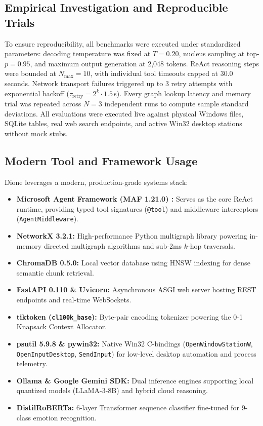 \documentclass[conference,a4paper]{IEEEtran}
\begin{document}
\subsection{Empirical Investigation and Reproducible Trials}
To ensure reproducibility, all benchmarks were executed under standardized parameters: decoding temperature was fixed at $T = 0.20$, nucleus sampling at top-$p = 0.95$, and maximum output generation at 2,048 tokens. ReAct reasoning steps were bounded at $N_{\text{max}} = 10$, with individual tool timeouts capped at 30.0 seconds. Network transport failures triggered up to 3 retry attempts with exponential backoff ($\tau_{\text{retry}} = 2^k \cdot 1.5$\,s). Every graph lookup latency and memory trial was repeated across $N = 3$ independent runs to compute sample standard deviations. All evaluations were executed live against physical Windows files, SQLite tables, real web search endpoints, and active Win32 desktop stations without mock stubs.

\subsection{Modern Tool and Framework Usage}
Dione leverages a modern, production-grade systems stack:
\begin{itemize}
    \item \textbf{Microsoft Agent Framework (MAF 1.21.0) \cite{microsoft2025agentframework}:} Serves as the core ReAct runtime, providing typed tool signatures (\texttt{@tool}) and middleware interceptors (\texttt{AgentMiddleware}).
    \item \textbf{NetworkX 3.2.1:} High-performance Python multigraph library powering in-memory directed multigraph algorithms and sub-2ms $k$-hop traversals.
    \item \textbf{ChromaDB 0.5.0:} Local vector database using HNSW indexing for dense semantic chunk retrieval.
    \item \textbf{FastAPI 0.110 \& Uvicorn:} Asynchronous ASGI web server hosting REST endpoints and real-time WebSockets.
    \item \textbf{tiktoken (\texttt{cl100k\_base}):} Byte-pair encoding tokenizer powering the 0-1 Knapsack Context Allocator.
    \item \textbf{psutil 5.9.8 \& pywin32:} Native Win32 C-bindings (\texttt{OpenWindowStationW}, \texttt{OpenInputDesktop}, \texttt{SendInput}) for low-level desktop automation and process telemetry.
    \item \textbf{Ollama \& Google Gemini SDK:} Dual inference engines supporting local quantized models (LLaMA-3-8B) and hybrid cloud reasoning.
    \item \textbf{DistilRoBERTa:} 6-layer Transformer sequence classifier fine-tuned for 9-class emotion recognition.
\end{itemize}
\end{document}
